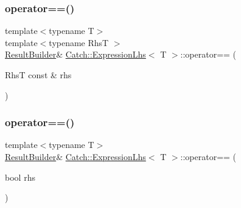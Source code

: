 \hypertarget{class_catch_1_1_expression_lhs_a2f7ad442c3e5e5764eee736345c40301}{}\label{class_catch_1_1_expression_lhs_a2f7ad442c3e5e5764eee736345c40301} 
\subsubsection{\texorpdfstring{operator==()}{operator==()}\hspace{0.1cm}{\footnotesize\ttfamily [1/2]}}
{\footnotesize\ttfamily template$<$typename T$>$ \\
template$<$typename RhsT $>$ \\
\hyperlink{class_catch_1_1_result_builder}{Result\+Builder}\& \hyperlink{class_catch_1_1_expression_lhs}{Catch\+::\+Expression\+Lhs}$<$ T $>$\+::operator== (\begin{DoxyParamCaption}\item[{RhsT const \&}]{rhs }\end{DoxyParamCaption})\hspace{0.3cm}{\ttfamily [inline]}}

\hypertarget{class_catch_1_1_expression_lhs_a6001030bcfbabc3981013ddffb3e3bb6}{}\label{class_catch_1_1_expression_lhs_a6001030bcfbabc3981013ddffb3e3bb6} 
\subsubsection{\texorpdfstring{operator==()}{operator==()}\hspace{0.1cm}{\footnotesize\ttfamily [2/2]}}
{\footnotesize\ttfamily template$<$typename T$>$ \\
\hyperlink{class_catch_1_1_result_builder}{Result\+Builder}\& \hyperlink{class_catch_1_1_expression_lhs}{Catch\+::\+Expression\+Lhs}$<$ T $>$\+::operator== (\begin{DoxyParamCaption}\item[{bool}]{rhs }\end{DoxyParamCaption})\hspace{0.3cm}{\ttfamily [inline]}}

\hypertarget{class_catch_1_1_expression_lhs_ad3602a7ad945c751004065b1007dc183}{}\label{class_catch_1_1_expression_lhs_ad3602a7ad945c751004065b1007dc183} 
